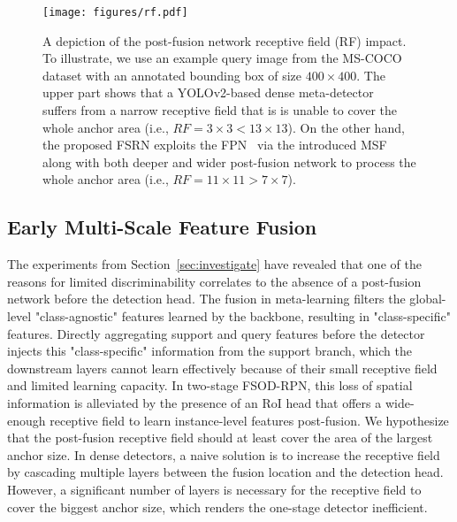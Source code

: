 \documentclass[10pt,twocolumn,letterpaper]{article}
\begin{document}
\begin{figure*}[t!]
 \centering
 \texttt{[image: figures/rf.pdf]}
 \caption{A depiction of the post-fusion network receptive field (RF) impact. To illustrate, we use an example query image from the MS-COCO~\cite{coco} dataset with an annotated bounding box of size $400\times400$. The upper part shows that a YOLOv2-based dense meta-detector~\cite{FSRW} suffers from a narrow receptive field that is is unable to cover the whole anchor area (i.e., $RF=3\times3 < 13\times13$). On the other hand, the proposed FSRN exploits the FPN~\cite{fpn} via the introduced MSF along with both deeper and wider post-fusion network to process the whole anchor area (i.e., $RF=11\times11 >7\times7$). }  \label{fig:receptive_field}\vspace{-1.5em}
\end{figure*} \subsection{Early Multi-Scale Feature Fusion}
The experiments from Section~\ref{sec:investigate} have revealed that one of the reasons for limited discriminability correlates to the absence of a post-fusion network before the detection head. The fusion in meta-learning filters the global-level "class-agnostic" features learned by the backbone, resulting in "class-specific" features. Directly aggregating support and query features before the detector injects this "class-specific" information from the support branch, which the downstream layers cannot learn effectively because of their small receptive field and limited learning capacity. In two-stage FSOD-RPN, this loss of spatial information is alleviated by the presence of an RoI head that offers a wide-enough receptive field to learn instance-level features post-fusion. We hypothesize that the post-fusion receptive field should at least cover the area of the largest anchor size. In dense detectors, a naive solution is to increase the receptive field by cascading multiple layers between the fusion location and the detection head. However, a significant number of layers is necessary for the receptive field to cover the biggest anchor size, which renders the one-stage detector inefficient. 
\end{document}
